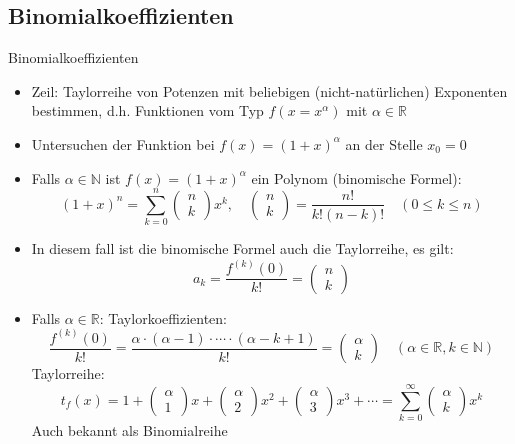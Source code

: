 \subsection{Binomialkoeffizienten}
\begin{lemma}{Binomialkoeffizienten}\\
  \begin{itemize}
    \item Zeil: Taylorreihe von Potenzen mit beliebigen (nicht-natürlichen) Exponenten bestimmen, d.h. Funktionen vom
      Typ \(f(x=x^{\alpha})\) mit \(\alpha \in \mathbb{R}\)
    \item Untersuchen der Funktion bei \(f(x)=(1+x)^{\alpha}\) an der Stelle \(x_0=0\)
    \item Falls \(\alpha\in\mathbb{N}\) ist \(f(x)=(1+x)^{\alpha}\) ein Polynom (binomische Formel):
      \[(1+x)^n=\sum_{k=0}^n{\begin{pmatrix}n\\k\end{pmatrix}x^k},\quad
      \begin{pmatrix}n\\k\end{pmatrix}=\frac{n!}{k!(n-k)!}\quad (0\le k \le n)\]
    \item In diesem fall ist die binomische Formel auch die Taylorreihe, es gilt:
      \[a_k=\frac{f^{(k)}(0)}{k!}=\begin{pmatrix}n\\k\end{pmatrix}\]
    \item Falls \(\alpha\in\mathbb{R}\):
    \subitem Taylorkoeffizienten:
    \[\frac{f^{(k)}(0)}{k!}=\frac{\alpha\cdot(\alpha -1)\cdot\cdots\cdot(\alpha-k+1)}{k!}= 
      \begin{pmatrix}\alpha\\k\end{pmatrix}\quad (\alpha\in\mathbb{R},k\in\mathbb{N})\]
    \subitem Taylorreihe:
    \[t_f(x)=1+\begin{pmatrix}\alpha\\1\end{pmatrix}x+\begin{pmatrix}\alpha\\2\end{pmatrix}x^2+
    \begin{pmatrix}\alpha\\3\end{pmatrix}x^3+\cdots =\sum_{k=0}^{\infty}{\begin{pmatrix}\alpha\\k\end{pmatrix}x^k}\]
    Auch bekannt als Binomialreihe
  \end{itemize}
\end{lemma}
